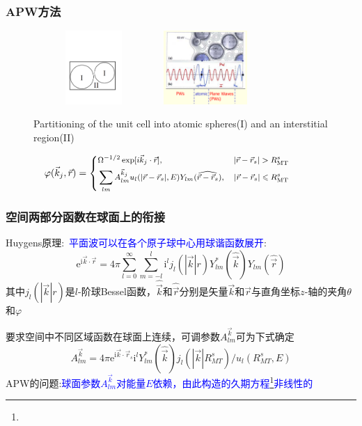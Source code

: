 {\frame
{
\frametitle{\textrm{APW}方法}
\begin{figure}[h!]
\centering
\includegraphics[height=1.10in,width=1.80in,viewport=40 150 545 465,clip]{Figures/Muffin_tin.pdf}
\includegraphics[height=1.10in,width=1.45in,viewport=1 20 485 435,clip]{Figures/APW.png}
\caption{\tiny \textrm{Partitioning of the unit cell into atomic spheres(I) and an interstitial region(II)}}%
\label{Muffin_tin-2}
\end{figure}
\begin{displaymath}
\hskip -28pt\footnotesize \varphi(\vec k_j,\vec r)=\left\{
  \begin{aligned}
    &\Omega^{-1/2}\exp[i\vec k_j\cdot\vec r],&|\vec r-\vec r_s|>R_{\mathrm{MT}}^s\\
    &\sum_{lm}A_{lm}^{\vec k_j}u_l(|\vec r-\vec r_s|,E)Y_{lm}(\widehat{\vec r-\vec r_s}),&|\vec r-\vec r_s|\leqslant R_{\mathrm{MT}}^s
  \end{aligned}
\right.
\end{displaymath}
}

\frame
{
	\frametitle{空间两部分函数在球面上的衔接}
	\textrm{Huygens}原理:~\textcolor{blue}{平面波可以在各个原子球中心用球谐函数展开}:
	\begin{displaymath}
		\mathrm{e}^{\mathrm{i}\vec k\cdot\vec r}=4\pi\sum_{l=0}^{\infty}\sum_{m=-l}^l\mathrm{i}^lj_l(|\vec k|r)Y_{lm}^{\ast}(\hat{\vec k})Y_{lm}(\hat{\vec r})
	\end{displaymath}
	其中$j_l(|\vec k|r)$是$l$-阶球\textrm{Bessel}函数，$\hat{\vec k}$和$\hat{\vec r}$分别是矢量$\vec k$和$\vec r$与直角坐标$z$-轴的夹角$\theta$和$\varphi$

	要求空间中不同区域函数在球面上连续，可调参数$A_{lm}^{\vec k}$可为下式确定
\begin{displaymath}
	A_{lm}^{\vec k}=4\pi\mathrm{e}^{\mathrm{i}\vec k\cdot\vec r_s}\mathrm{i}^lY_{lm}^{\ast}(\hat{\vec k})j_l(|\vec k|R_{MT}^s)/u_l(R_{MT}^s,E)
\end{displaymath}
\textrm{APW}的问题:\textcolor{blue}{球面参数$A_{lm}^{\vec k}$对能量$E$依赖，由此构造的久期方程\footnote{\fontsize{7.2pt}{6.2pt}}非线性的}
}

}
